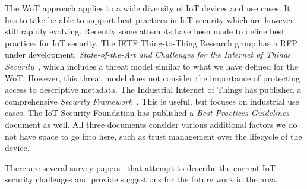 The WoT approach applies to a wide diversity of IoT devices and use cases.
It has to take be able to support best practices in IoT security which
are however still rapidly evolving.
Recently some attempts have been made to define
best practices for IoT security.
The IETF Thing-to-Thing Research group has a RFP under development,
\emph{State-of-the-Art and Challenges for the Internet of Things 
Security}~\cite{Garcia2017a}, which includes a threat model similar to 
what we have defined for the WoT.  
However, this threat model does not consider the 
importance of protecting access to descriptive metadata.
The Industrial Internet of Things has published a comprehensive
\emph{Security Framework}~\cite{Iic2016sf}.
This is useful, but focuses on industrial use cases.
The IoT Security Foundation has published
a \textit{Best Practices Guidelines}~\cite{Iotsf2017a}
document as well.
All three documents consider various additional factors we do
not have space to go into here, such as trust management over the 
lifecycle of the device.

There are several survey papers~\cite{Iot2020,Xu2014,Fernandes2017} that attempt to describe 
the current IoT security challenges and provide suggestions for the future work in the area.

